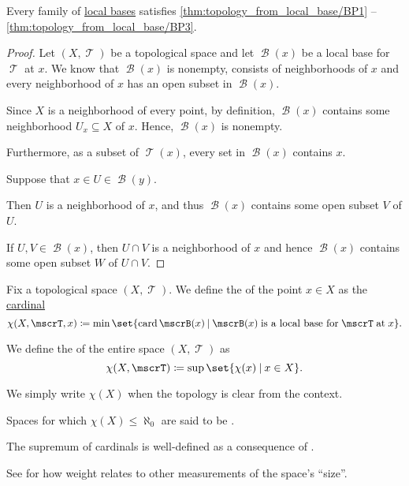 \begin{proposition}\label{thm:local_base_can_generate_topology}
  Every family of \hyperref[def:topological_local_base]{local bases} satisfies \ref{thm:topology_from_local_base/BP1} -- \ref{thm:topology_from_local_base/BP3}.
\end{proposition}
\begin{proof}
  Let \( (X, \mscrT) \) be a topological space and let \( \mscrB(x) \) be a local base for \( \mscrT \) at \( x \). We know that \( \mscrB(x) \) is nonempty, consists of neighborhoods of \( x \) and every neighborhood of \( x \) has an open subset in \( \mscrB(x) \).

   Since \( X \) is a neighborhood of every point, by definition, \( \mscrB(x) \) contains some neighborhood \( U_x \subseteq X \) of \( x \). Hence, \( \mscrB(x) \) is nonempty.

  Furthermore, as a subset of \( \mscrT(x) \), every set in \( \mscrB(x) \) contains \( x \).

   Suppose that \( x \in U \in \mscrB(y) \).

  Then \( U \) is a neighborhood of \( x \), and thus \( \mscrB(x) \) contains some open subset \( V \) of \( U \).

   If \( U, V \in \mscrB(x) \), then \( U \cap V \) is a neighborhood of \( x \) and hence \( \mscrB(x) \) contains some open subset \( W \) of \( U \cap V \).
\end{proof}

\begin{definition}\label{def:topological_space_character}
  Fix a topological space \( (X, \mscrT) \). We define the  of the point \( x \in X \) as the \hyperref[def:cardinal]{cardinal}
  \begin{equation*}
    \chi(X, \mscrT, x) \coloneqq \min \set{ \card \mscrB(x) \given \mscrB(x) \T{is a local base for} \mscrT \T{at} x }.
  \end{equation*}

  We define the  of the entire space \( (X, \mscrT) \) as
  \begin{equation*}
    \chi(X, \mscrT) \coloneqq \sup \set{ \chi(x) \given x \in X }.
  \end{equation*}

  We simply write \( \chi(X) \) when the topology is clear from the context.

  Spaces for which \( \chi(X) \leq \hyperref[def:aleph_hierarchy]{\aleph_0} \) are said to be .
\end{definition}
\begin{comments}
  \item The supremum of cardinals is well-defined as a consequence of .
  \item See  for how weight relates to other measurements of the space's \enquote{size}.
\end{comments}

